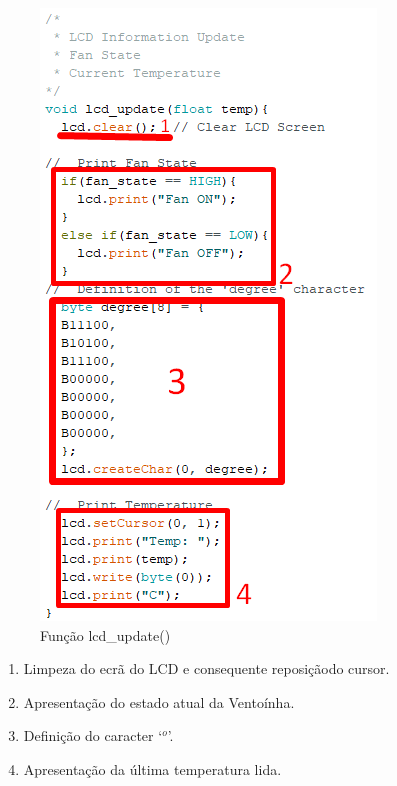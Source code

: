 \begin{figure}[H]
    \centering
    \includegraphics[scale=0.5]{images/codigo/sisB_lcd.png}
    \caption{Função lcd\_update()}
\end{figure}

\begin{enumerate}
    \item Limpeza do ecrã do LCD e consequente reposiçãodo cursor.
    \item Apresentação do estado atual da Ventoínha.
    \item Definição do caracter `$^{o}$'.
    \item Apresentação da última temperatura lida.
\end{enumerate}